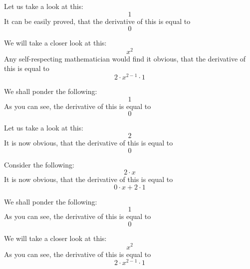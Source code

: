 \documentclass{article}
\begin{document}
Let us take a look at this:
\begin{equation}
1 
\end{equation}
It can be easily proved, that the derivative of this is equal to
\begin{equation}
0 
\end{equation}

We will take a closer look at this:
\begin{equation}
x ^{2 } 
\end{equation}
Any self-respecting mathematician would find it obvious, that the derivative of this is equal to
\begin{equation}
2 \cdot x ^{2 - 1 } \cdot 1 
\end{equation}

We shall ponder the following:
\begin{equation}
1 
\end{equation}
As you can see, the derivative of this is equal to
\begin{equation}
0 
\end{equation}

Let us take a look at this:
\begin{equation}
2 
\end{equation}
It is now obvious, that the derivative of this is equal to
\begin{equation}
0 
\end{equation}

Consider the following:
\begin{equation}
2 \cdot x 
\end{equation}
It is now obvious, that the derivative of this is equal to
\begin{equation}
0 \cdot x + 2 \cdot 1 
\end{equation}

We shall ponder the following:
\begin{equation}
1 
\end{equation}
As you can see, the derivative of this is equal to
\begin{equation}
0 
\end{equation}

We will take a closer look at this:
\begin{equation}
x ^{2 } 
\end{equation}
As you can see, the derivative of this is equal to
\begin{equation}
2 \cdot x ^{2 - 1 } \cdot 1 
\end{equation}
\end{document}
